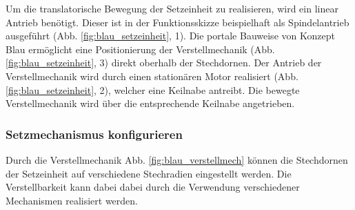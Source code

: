 Um die translatorische Bewegung der Setzeinheit zu realisieren, wird ein linear Antrieb benötigt. Dieser ist in der Funktionsskizze beispielhaft als Spindelantrieb ausgeführt (Abb. \ref{fig:blau_setzeinheit}, 1). Die portale Bauweise von Konzept Blau ermöglicht eine Positionierung der Verstellmechanik (Abb. \ref{fig:blau_setzeinheit}, 3) direkt oberhalb der Stechdornen. Der Antrieb der Verstellmechanik wird durch einen stationären Motor realisiert (Abb. \ref{fig:blau_setzeinheit}, 2), welcher eine Keilnabe antreibt. Die bewegte Verstellmechanik wird über die entsprechende Keilnabe angetrieben.

\subsubsection{Setzmechanismus konfigurieren}
Durch die Verstellmechanik Abb. \ref{fig:blau_verstellmech} können die Stechdornen der Setzeinheit auf verschiedene Stechradien eingestellt werden. Die Verstellbarkeit kann dabei dabei durch die Verwendung verschiedener Mechanismen realisiert werden. 
